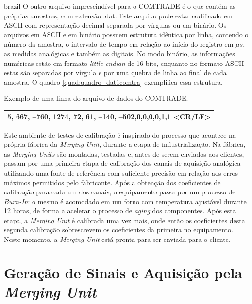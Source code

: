 \begin{otherlanguage*}{brazil}
O outro arquivo imprescindível para o COMTRADE é o que contém as próprias amostras, com extensão .dat. Este arquivo pode estar codificado em ASCII com representação decimal separada por vírgulas ou em binário. Os arquivos em ASCII e em binário possuem estrutura idêntica por linha, contendo o número da amostra, o intervalo de tempo em relação ao início do registro em $\mu s$, as medidas analógicas e também as digitais. No modo binário, as informações numéricas estão em formato \textit{little-endian} de 16 bits, enquanto no formato ASCII estas são separadas por vírgula e por uma quebra de linha ao final de cada amostra. O quadro \ref{quad:quadro_dat1comtra} exemplifica essa estrutura.


\begin{quadro}[htb]
\caption[Exemplo de uma linha do arquivo de dados do COMTRADE]{Exemplo de uma linha do arquivo de dados do COMTRADE.}
\label{quad:quadro_dat1comtra}
\centering
\begin{tabular}{|c|}
5, 667, –760, 1274, 72, 61, –140, –502,0,0,0,0,1,1 <CR/LF>\\
\hline
\end{tabular}
\end{quadro}

Este ambiente de testes de calibração é inspirado do processo que acontece na própria fábrica da \textit{Merging Unit}, durante a etapa de industrialização. Na fábrica, as \textit{Merging Units} são montadas, testadas e, antes de serem enviados aos clientes, passam por uma primeira etapa de calibração dos canais de aquisição analógica utilizando uma fonte de referência com suficiente precisão em relação aos erros máximos permitidos pelo fabricante. Após a obtenção dos coeficientes de calibração para cada um dos canais, o equipamento passa por um processo de \textit{Burn-In}: o mesmo é acomodado em um forno com temperatura ajustável durante 12 horas, de forma a acelerar o processo de \textit{aging} dos componentes. Após esta etapa, a \textit{Merging Unit} é calibrada uma vez mais, onde então os coeficientes desta segunda calibração sobrescrevem os coeficientes da primeira no equipamento. Neste momento, a \textit{Merging Unit} está pronta para ser enviada para o cliente.

\section{Geração de Sinais e Aquisição pela \textit{Merging Unit}}


\end{otherlanguage*}
